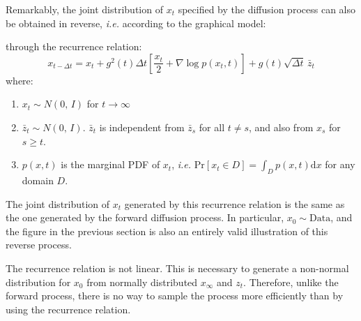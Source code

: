 \documentclass[10pt,letterpaper]{article}
\newcommand{\dd}{\mathrm{d}}
\newcommand{\normal}[2]{N\!\left(#1,\,#2\right)}
\begin{document}
Remarkably, the joint distribution of $x_t$ specified by the diffusion process
can also be obtained in reverse, \textit{i.e.} according to the graphical
model:
\begin{center}
\end{center}
through the recurrence relation:
\begin{equation}
    x_{t - \Delta t} = x_t + g^2(t) \Delta t \left[\frac{x_t}{2} + 
    \nabla \log p(x_t, t) \right] + g(t) \sqrt{\Delta t}\, \bar{z}_t
\end{equation}
where:
\begin{enumerate}
    \item $x_t \sim \normal{0}{I}$ for $t \to \infty$
    \item $\bar{z}_t \sim \normal{0}{I}$. $\bar{z}_t$ is independent from
        $\bar{z}_s$ for all $t \neq s$, and also from $x_s$ for $s \geq t$.
    \item $p(x,t)$ is the marginal PDF of $x_t$, \textit{i.e.}
        \mbox{$\mathrm{Pr}[x_t\in D] = \int_D p(x, t) \dd x$} for any domain
        $D$. 
\end{enumerate}

The joint distribution of $x_t$ generated by this recurrence relation is the
same as the one generated by the forward diffusion process. In particular,
$x_0 \sim \mathrm{Data}$, and the figure in the previous section is also an
entirely valid illustration of this reverse process.

The recurrence relation is not linear. This is necessary to generate a
non-normal distribution for $x_0$ from normally distributed $x_\infty$ and
$z_t$. Therefore, unlike the forward process, there is no way to sample the
process more efficiently than by using the recurrence relation.
\end{document}

